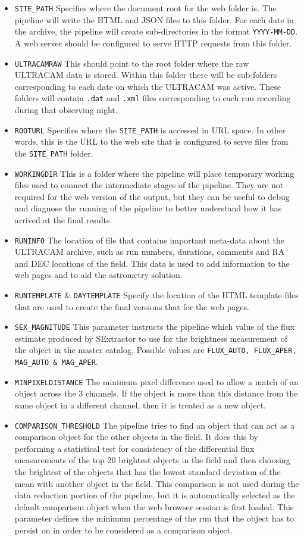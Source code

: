 \begin{itemize}
	\item \texttt{SITE\_PATH} Specifies where the document root for the web folder is. The pipeline will write the HTML and JSON files to this folder. For each date in the archive, the pipeline will create sub-directories in the format \texttt{YYYY-MM-DD}. A web server should be configured to serve HTTP requests from this folder. 
	\item \texttt{ULTRACAMRAW} This should point to the root folder where the raw ULTRACAM data is stored. Within this folder there will be sub-folders corresponding to each date on which the ULTRACAM was active. These folders will contain \texttt{.dat} and \texttt{.xml} files corresponding to each run recording during that observing night.  
	\item \texttt{ROOTURL} Specifies where the \texttt{SITE\_PATH} is accessed in URL space. In other words, this is the URL to the web site that is configured to serve files from the \texttt{SITE\_PATH} folder. 
	\item \texttt{WORKINGDIR} This is a folder where the pipeline will place temporary working files used to connect the intermediate stages of the pipeline. They are not required for the web version of the output, but they can be useful to debug and diagnose the running of the pipeline to better understand how it has arrived at the final results. 
	\item \texttt{RUNINFO} The location of file that contains important meta-data about the ULTRACAM archive, such as run numbers, durations, comments and RA and DEC locations of the field. This data is used to add information to the web pages and to aid the astrometry solution. 
	\item \texttt{RUNTEMPLATE} \& \texttt{DAYTEMPLATE} Specify the location of the HTML template files that are used to create the final versions that for the web pages. 
	\item \texttt{SEX\_MAGNITUDE} This parameter instructs the pipeline which value of the flux estimate produced by {SExtractor} to use for the brightness measurement of the object in the master catalog. Possible values are \texttt{FLUX\_AUTO, FLUX\_APER, MAG\_AUTO \& MAG\_APER}.
	\item \texttt{MINPIXELDISTANCE} The minimum pixel difference used to allow a match of an object across the 3 channels. If the object is more than this distance from the same object in a different channel, then it is treated as a new object.
	\item \texttt{COMPARISON\_THRESHOLD} The pipeline tries to find an object that can act as a comparison object for the other objects in the field. It does this by performing a statistical test for consistency of the differential flux measurements of the top 20 brightest objects in the field and then choosing the brightest of the objects that has the lowest standard deviation of the mean with another object in the field. This comparison is not used during the data reduction portion of the pipeline, but it is automatically selected as the default comparison object when the web browser session is first loaded. This parameter defines the minimum percentage of the run that the object has to persist on in order to be considered as a comparison object. 

\end{itemize}

